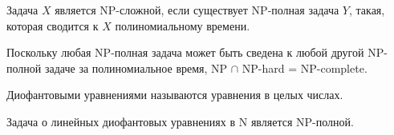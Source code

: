     \begin{Def}
         Задача $X$ является NP-сложной, если существует NP-полная задача $Y$, такая, которая сводится к $X$ полиномиальному времени.
    \end{Def}
    \begin{Rem}
        Поскольку любая NP-полная задача может быть сведена к любой другой NP-полной задаче за полиномиальное время, 
        NP $\cap$ NP-hard = NP-complete.
    \end{Rem}
    \begin{Def}
        Диофантовыми уравнениями называются уравнения в целых числах.
    \end{Def}
    \begin{Thm}
        Задача о линейных диофантовых уравнениях в N является NP-полной.
    \end{Thm}

    
    

